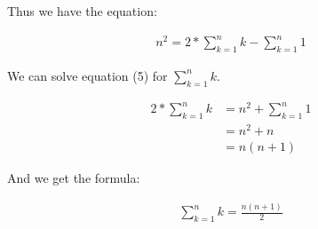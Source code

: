 \documentclass{article}
\begin{document}
\begin{flushleft}
Thus we have the equation:
\end{flushleft}
\begin{align}
n^2 = 2 * \sum_{k=1}^{n} k - \sum_{k=1}^{n} 1
\end{align}
\begin{flushleft}
We can solve equation (5) for $\sum_{k=1}^{n} k$.
\end{flushleft}
\begin{align*}
2 *  \sum_{k=1}^{n} k &= n^2 + \sum_{k=1}^{n} 1 \\
&= n^2 + n \\
&= n(n+1)
\end{align*}
\begin{flushleft}
And we get the formula:
\end{flushleft}
\begin{align}
\sum_{k=1}^{n} k = \frac{n(n+1)}{2}
\end{align}
\end{document}
